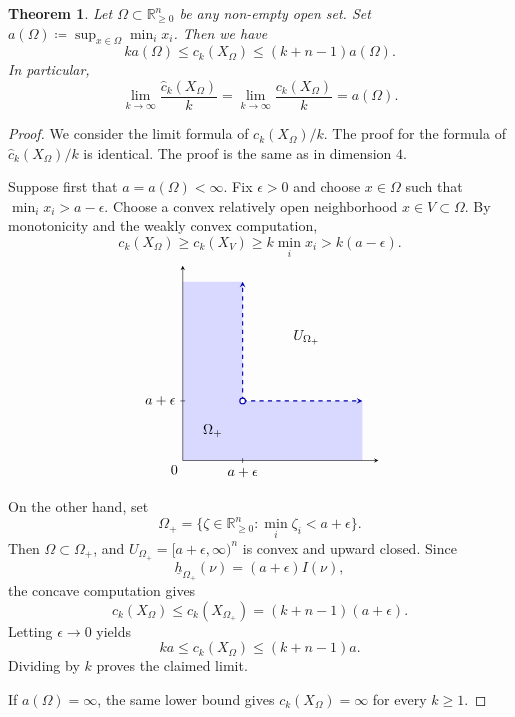 \documentclass[11pt]{amsart}
\numberwithin{equation}{section}
\theoremstyle{plain}
\newtheorem{Thm}{Theorem}[section]
\theoremstyle{definition}
\theoremstyle{remark}
\begin{document}
\begin{Thm}\label{thm: weyl law for toric}Let $\Omega\subset \mathbb R_{\geq 0}^n$ be any non-empty open set. Set $a(\Omega)\coloneqq \sup_{x\in {\Omega}}\min_i x_i $. Then we have
\[ ka(\Omega)\leq c_k(X_\Omega) \leq (k+n-1)a(\Omega). \]
In particular, 
\[\lim_{k\to \infty}\frac{\widehat{c}_k(X_\Omega)}{k}=\lim_{k\to \infty}\frac{{c}_k(X_\Omega)}{k} = a(\Omega).\]
\end{Thm}
\begin{proof}We consider the limit formula of $c_k(X_\Omega)/k$. The proof for the formula of $\widehat{c}_k(X_\Omega)/k$ is identical. The proof is the same as \cite{Irie_ChainModel} in dimension $4$. 

Suppose first that $a=a(\Omega)<\infty$.
Fix $\epsilon>0$ and choose $x\in\Omega$ such that
$\min_i x_i>a-\epsilon$.
Choose a convex relatively open neighborhood
$x\in V\subset\Omega$.
By monotonicity and the weakly convex computation,
\[
  c_k(X_\Omega)
\geq   c_k(X_V)
\geq k\min_i x_i
>k(a-\epsilon).
\]
\[\begin{tikzpicture}[scale=1, >=stealth]
  \def\b{1.5}
  \def\L{4.5}

  \fill[blue!15]
    (0,0) -- (\L,0) -- (\L,\b)
    -- (\b,\b) -- (\b,\L) -- (0,\L) -- cycle;

  \draw[blue!70!black, thick, dashed, ->]
    (\b,\b) -- (\L,\b);
  \draw[blue!70!black, thick, dashed, ->]
    (\b,\b) -- (\b,\L);

  \draw[->] (0,0) -- (4.9,0) ;
  \draw[->] (0,0) -- (0,4.9) ;
  \node[below left] at (0,0) {$0$};

  \draw (\b,0.06) -- (\b,-0.06)
    node[below] {$a+\epsilon$};
  \draw (0.06,\b) -- (-0.06,\b)
    node[left] {$a+\epsilon$};

  \draw[blue!70!black, thick, fill=white]
    (\b,\b) circle (2pt);


  \node at (0.75,0.75) {$\Omega_+$};
  \node at (3.1,3.1) {$U_{\Omega_+}$};
\end{tikzpicture}\]
On the other hand, set
\[
\Omega_+
=\{\zeta\in\mathbb R_{\ge0}^n:
\min_i\zeta_i<a+\epsilon\}.
\]
Then $\Omega\subset\Omega_+$, and
$U_{\Omega_+}=[a+\epsilon,\infty)^n$ is convex
and upward closed.
Since
\[
\underline h_{\Omega_+}(\nu)
=(a+\epsilon)I(\nu),
\]
the concave computation gives
\[
  c_k(X_\Omega)
\leq c_k(X_{\Omega_+})
=(k+n-1)(a+\epsilon).
\]
Letting $\epsilon\to0$ yields
\[ 
ka\leq  c_k(X_\Omega)\leq(k+n-1)a.
\]
Dividing by $k$ proves the claimed limit.

If $a(\Omega)=\infty$, the same lower bound gives
$  c_k(X_\Omega)=\infty$ for every $k\geq 1$.
\end{proof}
\end{document}
